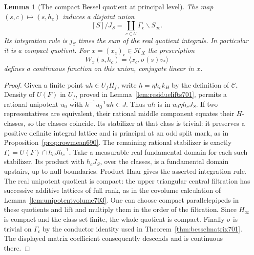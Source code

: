 \documentclass[a4paper,11pt]{article}
\newtheorem{lemma}[proposition]{Lemma}
\theoremstyle{definition}
\theoremstyle{remark}
\numberwithin{equation}{section}
\begin{document}
\begin{lemma}[The compact Bessel quotient at principal level]\leavevmode
\label{lem:besselquot707}
The map \((s,c)\mapsto(s,h_c)\) induces a disjoint union
\[
              [S]/J_S=\coprod_{c\in\mathcal C}
                                \Gamma_c\backslash S_\infty .
\]
Its integration rule is \(j_S\) times the sum of the real
quotient integrals. In particular it is a compact quotient.
For \(x=(x_c)_c\in\mathcal H_X\) the prescription
\[
          W_x(s,h_c)=\langle x_c,\sigma(s)v_*\rangle
\]
defines a continuous function on this union, conjugate
linear in \(x\).
\end{lemma}
\begin{proof}
Given a finite point \(u h\in U_fH_f\), write
\(h=\eta h_c k_H\) by the definition of \(\mathcal C\).
Density of \(U(F)\) in \(U_f\), proved in
Lemma~\ref{lem:residuelifts701}, permits a rational unipotent
\(u_0\) with \(h^{-1}u_0^{-1}uh\in J\). Thus \(u h\) is in
\(u_0\eta h_cJ_S\). If two representatives are equivalent,
their rational middle component equates their \(H\)-classes,
so the classes coincide. Its stabilizer at that class is
trivial: it preserves a positive definite integral lattice
and is principal at an odd split mark, as in
Proposition~\ref{prop:rowmean690}. The remaining rational
stabilizer is exactly \(\Gamma_c=U(F)\cap h_cJh_c^{-1}\).
Take a measurable real fundamental domain for each such
stabilizer. Its product with \(h_cJ_S\), over the classes,
is a fundamental domain upstairs, up to null boundaries.
Product Haar gives the asserted integration rule. The real
unipotent quotient is compact: the upper triangular central
filtration has successive additive lattices of full rank,
as in the covolume calculation of Lemma~\ref{lem:unipotentvolume703}.
One can choose compact parallelepipeds in these quotients
and lift and multiply them in the order of the filtration.
Since \(H_\infty\) is compact and the class set finite, the
whole quotient is compact. Finally \(\sigma\) is trivial
on \(\Gamma_c\) by the conductor identity used in
Theorem~\ref{thm:besselmatrix701}. The displayed matrix
coefficient consequently descends and is continuous there.
\end{proof}
\end{document}
